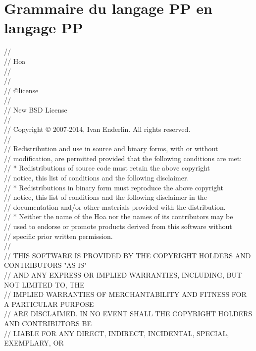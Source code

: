\section{Grammaire du langage PP en langage PP}
\label{appendices:grammar_of_pp}

\begin{bigbigpre}
// \\
// Hoa \\
// \\
// \\
// @license \\
// \\
// New BSD License \\
// \\
// Copyright © 2007-2014, Ivan Enderlin. All rights reserved. \\
// \\
// Redistribution and use in source and binary forms, with or without \\
// modification, are permitted provided that the following conditions are met: \\
//     * Redistributions of source code must retain the above copyright \\
//       notice, this list of conditions and the following disclaimer. \\
//     * Redistributions in binary form must reproduce the above copyright \\
//       notice, this list of conditions and the following disclaimer in the \\
//       documentation and/or other materials provided with the distribution. \\
//     * Neither the name of the Hoa nor the names of its contributors may be \\
//       used to endorse or promote products derived from this software without \\
//       specific prior written permission. \\
// \\
// THIS SOFTWARE IS PROVIDED BY THE COPYRIGHT HOLDERS AND CONTRIBUTORS "AS IS" \\
// AND ANY EXPRESS OR IMPLIED WARRANTIES, INCLUDING, BUT NOT LIMITED TO, THE \\
// IMPLIED WARRANTIES OF MERCHANTABILITY AND FITNESS FOR A PARTICULAR PURPOSE \\
// ARE DISCLAIMED. IN NO EVENT SHALL THE COPYRIGHT HOLDERS AND CONTRIBUTORS BE \\
// LIABLE FOR ANY DIRECT, INDIRECT, INCIDENTAL, SPECIAL, EXEMPLARY, OR \\

\end{bigbigpre}
